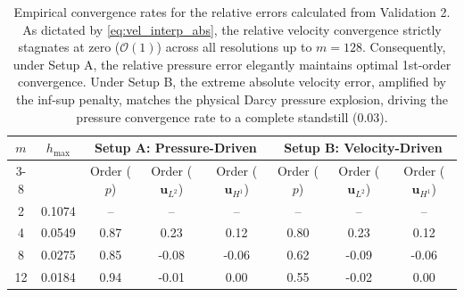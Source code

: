 \documentclass{elsarticle}
\begin{document}
\begin{table}[htbp]
    \centering
    \caption{Empirical convergence rates for the relative errors calculated from Validation 2. As dictated by \eqref{eq:vel_interp_abs}, the relative velocity convergence strictly stagnates at zero ($\mathcal{O}(1)$) across all resolutions up to $m=128$. Consequently, under Setup A, the relative pressure error elegantly maintains optimal 1st-order convergence. Under Setup B, the extreme absolute velocity error, amplified by the inf-sup penalty, matches the physical Darcy pressure explosion, driving the pressure convergence rate to a complete standstill ($0.03$).}
    \label{tab:error_amplification_orders}
    \renewcommand{\arraystretch}{1.2}
    \begin{tabular}{cc | ccc | ccc}
        \toprule
        \multirow{2}{*}{$m$} & \multirow{2}{*}{$h_{\max}$} & \multicolumn{3}{c|}{\textbf{Setup A: Pressure-Driven}} & \multicolumn{3}{c}{\textbf{Setup B: Velocity-Driven}}                                                                                                      \\
        \cmidrule{3-8}
                             &                             & Order ($p$)                                            & Order ($\mathbf{u}_{L^2}$)                            & Order ($\mathbf{u}_{H^1}$) & Order ($p$) & Order ($\mathbf{u}_{L^2}$) & Order ($\mathbf{u}_{H^1}$) \\
        \midrule
        2                    & 0.1074                      & --                                                     & --                                                    & --                         & --          & --                         & --                         \\
        4                    & 0.0549                      & 0.87                                                   & \phantom{-}0.23                                       & \phantom{-}0.12            & 0.80        & \phantom{-}0.23            & \phantom{-}0.12            \\
        8                    & 0.0275                      & 0.85                                                   & -0.08                                                 & -0.06                      & 0.62        & -0.09                      & -0.06                      \\
        12                   & 0.0184                      & 0.94                                                   & -0.01                                                 & \phantom{-}0.00            & 0.55        & -0.02                      & \phantom{-}0.00            \\

\end{tabular}
\end{table}
\end{document}
